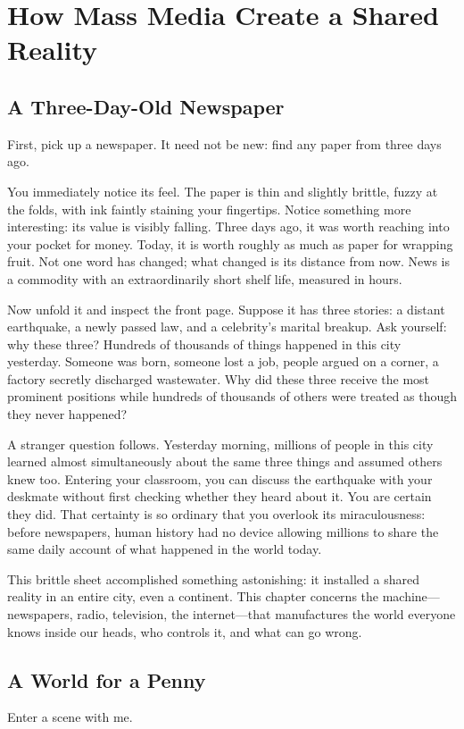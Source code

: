 \chapter[Mass Media Create a Shared Reality]{How Mass Media Create a Shared Reality}
\section{A Three-Day-Old Newspaper}
First, pick up a newspaper. It need not be new: find any paper from three days ago.

You immediately notice its feel. The paper is thin and slightly brittle, fuzzy at the folds, with ink faintly staining your fingertips. Notice something more interesting: its value is visibly falling. Three days ago, it was worth reaching into your pocket for money. Today, it is worth roughly as much as paper for wrapping fruit. Not one word has changed; what changed is its distance from now. News is a commodity with an extraordinarily short shelf life, measured in hours.

Now unfold it and inspect the front page. Suppose it has three stories: a distant earthquake, a newly passed law, and a celebrity's marital breakup. Ask yourself: why these three? Hundreds of thousands of things happened in this city yesterday. Someone was born, someone lost a job, people argued on a corner, a factory secretly discharged wastewater. Why did these three receive the most prominent positions while hundreds of thousands of others were treated as though they never happened?

A stranger question follows. Yesterday morning, millions of people in this city learned almost simultaneously about the same three things and assumed others knew too. Entering your classroom, you can discuss the earthquake with your deskmate without first checking whether they heard about it. You are certain they did. That certainty is so ordinary that you overlook its miraculousness: before newspapers, human history had no device allowing millions to share the same daily account of what happened in the world today.

This brittle sheet accomplished something astonishing: it installed a shared reality in an entire city, even a continent. This chapter concerns the machine---newspapers, radio, television, the internet---that manufactures the world everyone knows inside our heads, who controls it, and what can go wrong.

\section{A World for a Penny}
Enter a scene with me.

